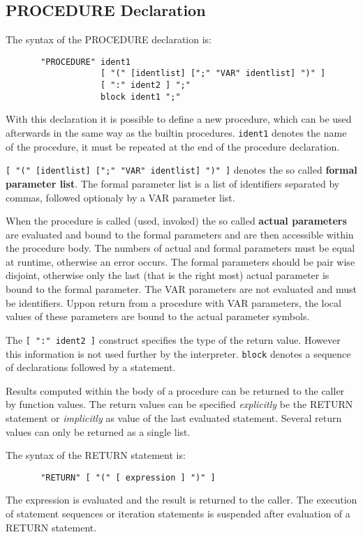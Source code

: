 \subsection{PROCEDURE Declaration}
   
The syntax of the PROCEDURE declaration is:
\begin{verbatim}
       "PROCEDURE" ident1 
                   [ "(" [identlist] [";" "VAR" identlist] ")" ]
                   [ ":" ident2 ] ";" 
                   block ident1 ";"
\end{verbatim}
With this declaration it is possible to define a new
procedure, which can be used afterwards in the same way as the
builtin procedures.
\verb/ident1/ denotes the name of the procedure, it must be
repeated at the end of the procedure declaration.

\verb/[ "(" [identlist] [";" "VAR" identlist] ")" ]/ denotes the 
so called {\bf formal parameter list}.
The formal parameter list is a list of identifiers
separated by commas, followed optionaly  
by a VAR parameter list.

When the procedure is called (used, invoked) the so called
{\bf actual parameters}
are evaluated and bound to the formal parameters and
are then accessible within the procedure body.
The numbers of actual and formal parameters
must be equal at runtime, otherwise an 
error occurs.
The formal parameters should be pair wise disjoint, 
otherwise only the last (that is the right most) 
actual parameter is bound to the formal parameter. 
The VAR parameters are not evaluated and must 
be identifiers. Uppon return from a procedure with 
VAR parameters, the local values of these parameters are 
bound to the actual parameter symbols.

The \verb/[ ":" ident2 ]/ construct specifies the 
type of the return value. However this information is
not used further by the interpreter. 
\verb/block/ denotes a sequence of 
declarations followed by a statement.

Results computed within the body of a procedure can be
returned to the caller by function values. 
The return values can be specified {\em explicitly}
be the RETURN statement or {\em implicitly}
as value of the last evaluated statement.
Several return values can only be returned as 
a single list.

The syntax of the RETURN statement is:
\begin{verbatim}
       "RETURN" [ "(" [ expression ] ")" ]
\end{verbatim}
The expression is evaluated and the result is
returned to the caller. The execution of
statement sequences or iteration statements is 
suspended after evaluation of a RETURN statement.

